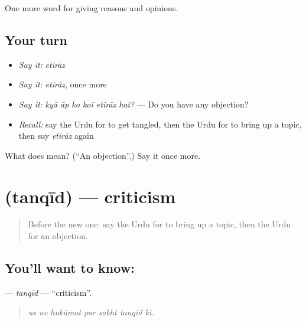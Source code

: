 \begin{grammarlens}[title={What you've built}]
One more word for giving reasons and opinions.
\end{grammarlens}

\subsection*{Your turn}
\begin{itemize}
\raggedright
  \item \emph{Say it:} \emph{etirāz}
  \item \emph{Say it:} \emph{etirāz}, once more
  \item \emph{Say it:} \emph{kyā āp ko koī etirāz hai?} — Do you have any objection?
  \item \emph{Recall:} say the Urdu for to get tangled, then the Urdu for to bring up a topic, then say \emph{etirāz} again
\end{itemize}

\begin{tcolorbox}[breakable,colback=teal!4,colframe=teal!35!black,title={Before you move on}]
What does  mean? (\textquotedblleft{}An objection\textquotedblright{}.) Say it once more.
\end{tcolorbox}
\section[\texorpdfstring{\ur{تنقید} (tanqīd)}{تنقید (tanqīd)}]{ (tanqīd) — criticism}

\label{lesson:UR-C348-tanqid}



\begin{quote}
Before the new one: say the Urdu for to bring up a topic, then the Urdu for an objection.
\end{quote}

\subsection*{You'll want to know: }
\textbf{} — \emph{tanqīd} — \textquotedblleft{}criticism\textquotedblright{}.

\begin{quote}
      
\end{quote}

\begin{quote}
\emph{us ne hukūmat par sakht tanqīd kī.}
\end{quote}

